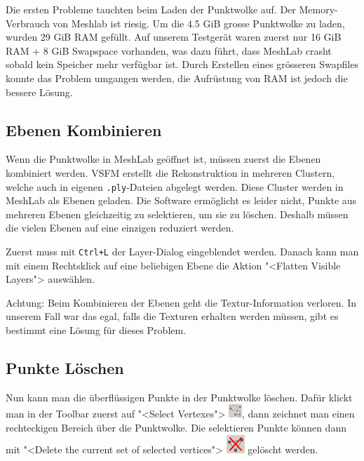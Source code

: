 Die ersten Probleme tauchten beim Laden der Punktwolke auf. Der Memory-Verbrauch
von Meshlab ist riesig. Um die 4.5 GiB grosse Punktwolke zu laden, wurden 29 GiB
RAM gefüllt. Auf unserem Testgerät waren zuerst nur 16 GiB RAM + 8 GiB Swapspace
vorhanden, was dazu führt, dass MeshLab crasht sobald kein Speicher mehr
verfügbar ist. Durch Erstellen eines grösseren Swapfiles konnte das Problem
umgangen werden, die Aufrüstung von RAM ist jedoch die bessere Lösung.

\subsection{Ebenen Kombinieren}

Wenn die Punktwolke in MeshLab geöffnet ist, müssen zuerst die Ebenen kombiniert
werden. VSFM erstellt die Rekonstruktion in mehreren Clustern, welche auch in
eigenen \texttt{.ply}-Dateien abgelegt werden. Diese Cluster werden in MeshLab
als Ebenen geladen. Die Software ermöglicht es leider nicht, Punkte aus mehreren
Ebenen gleichzeitig zu selektieren, um sie zu löschen. Deshalb müssen die vielen
Ebenen auf eine einzigen reduziert werden.

Zuerst muss mit \texttt{Ctrl+L} der Layer-Dialog eingeblendet werden. Danach
kann man mit einem Rechtsklick auf eine beliebigen Ebene die Aktion "<Flatten
Visible Layers"> auswählen.

Achtung: Beim Kombinieren der Ebenen geht die Textur-Information verloren. In
unserem Fall war das egal, falls die Texturen erhalten werden müssen, gibt es
bestimmt eine Lösung für dieses Problem.

\subsection{Punkte Löschen}

Nun kann man die überflüssigen Punkte in der Punktwolke löschen. Dafür klickt
man in der Toolbar zuerst auf "<Select Vertexes">
\includegraphics[scale=0.75]{images/meshlab_icon_select}, dann zeichnet man
einen rechteckigen Bereich über die Punktwolke. Die selektieren Punkte können
dann mit "<Delete the current set of selected vertices">
\includegraphics[scale=0.75]{images/meshlab_icon_delete} gelöscht werden.

